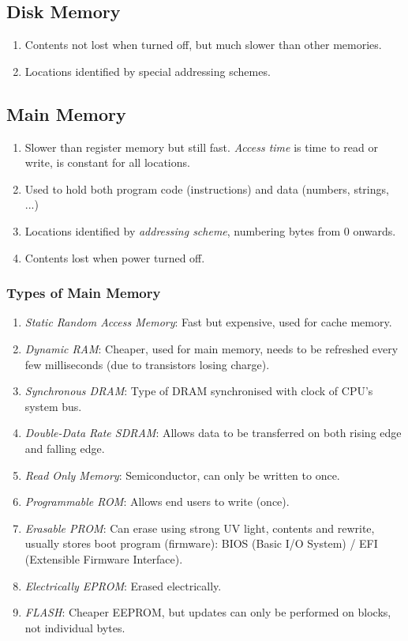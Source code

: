 \documentclass[twocolumn,english]{article}
\begin{document}
\subsection{Disk Memory}
\begin{enumerate}
\item Contents not lost when turned off, but much slower than other memories.
\item Locations identified by special addressing schemes.
\end{enumerate}

\subsection{Main Memory}
\begin{enumerate}
\item Slower than register memory but still fast. \emph{Access time} is
time to read or write, is constant for all locations.
\item Used to hold both program code (instructions) and data (numbers, strings,
...)
\item Locations identified by \emph{addressing scheme}, numbering bytes
from 0 onwards.
\item Contents lost when power turned off.
\end{enumerate}

\subsubsection{Types of Main Memory}
\begin{enumerate}
\item \emph{Static Random Access Memory}: Fast but expensive, used for cache
memory.
\item \emph{Dynamic RAM}: Cheaper, used for main memory, needs to be refreshed
every few milliseconds (due to transistors losing charge).
\item \emph{Synchronous DRAM}: Type of DRAM synchronised with clock of CPU's
system bus.
\item \emph{Double-Data Rate SDRAM}: Allows data to be transferred on both
rising edge and falling edge.
\item \emph{Read Only Memory}: Semiconductor, can only be written to once.
\item \emph{Programmable ROM}: Allows end users to write (once).
\item \emph{Erasable PROM}: Can erase using strong UV light, contents and
rewrite, usually stores boot program (firmware): BIOS (Basic I/O System)
/ EFI (Extensible Firmware Interface).
\item \emph{Electrically EPROM}: Erased electrically.
\item \emph{FLASH}: Cheaper EEPROM, but updates can only be performed on
blocks, not individual bytes.
\end{enumerate}
\end{document}
